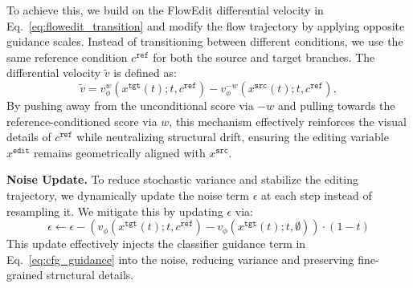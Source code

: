\documentclass[runningheads]{llncs}
\begin{document}
To achieve this, we build on the FlowEdit differential velocity in Eq.~\ref{eq:flowedit_transition} and modify the flow trajectory by applying opposite guidance scales.
Instead of transitioning between different conditions, we use the same reference condition $c^{\texttt{ref}}$ for both the source and target branches.
The differential velocity $\tilde{v}$ is defined as:
\begin{equation}
    \label{eq:red_diff_velocity}
    \tilde{v} = v_\phi^{w}(x^{\texttt{tgt}}(t); t, c^{\texttt{ref}}) - v_\phi^{-w}(x^{\texttt{src}}(t); t, c^{\texttt{ref}}),
\end{equation}
By pushing away from the unconditional score via $-w$ and pulling towards the reference-conditioned score via $w$, this mechanism effectively reinforces the visual details of $c^{\texttt{ref}}$ while neutralizing structural drift, ensuring the editing variable $x^{\texttt{edit}}$ remains geometrically aligned with $x^{\texttt{src}}$.


\textbf{Noise Update.}
To reduce stochastic variance and stabilize the editing trajectory, we dynamically update the noise term $\epsilon$ at each step instead of resampling it.
We mitigate this by updating $\epsilon$ via:
\begin{equation}
    \label{eq:red_dynamic_noise}
    \epsilon \leftarrow \epsilon - (v_\phi(x^{\texttt{tgt}}(t); t, c^{\texttt{ref}}) - v_\phi(x^{\texttt{tgt}}(t); t, \emptyset)) \cdot (1-t)
\end{equation}
This update effectively injects the classifier guidance term in Eq.~\ref{eq:cfg_guidance} into the noise, reducing variance and preserving fine-grained structural details.
\end{document}
